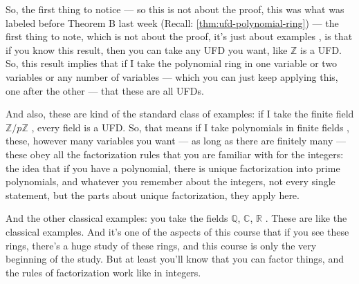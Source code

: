 \begin{speech}[00:00:39 - 00:02:17]
So, the first thing to notice --- so this is not about the proof, this was what was labeled before Theorem B last week  (Recall: \cref{thm:ufd-polynomial-ring}) --- the first thing to note, which is not about the proof, it's just about examples , is that if you know this result, then you can take any UFD you want, like $\mathbb{Z}$ is a UFD. So, this result implies that if I take the polynomial ring in one variable or two variables or any number of variables  --- which you can just keep applying this, one after the other --- that these are all UFDs.

And also, these are kind of the standard class of examples: if I take the finite field $\mathbb{Z} / p\mathbb{Z}$ , every field is a UFD. So, that means if I take polynomials in finite fields , these, however many variables you want --- as long as there are finitely many --- these obey all the factorization rules that you are familiar with for the integers: the idea that if you have a polynomial, there is unique factorization into prime polynomials, and whatever you remember about the integers, not every single statement, but the parts about unique factorization, they apply here.

And the other classical examples: you take the fields $\mathbb{Q}$, $\mathbb{C}$, $\mathbb{R}$ . These are like the classical examples. And it's one of the aspects of this course that if you see these rings, there's a huge study of these rings, and this course is only the very beginning of the study. But at least you'll know that you can factor things, and the rules of factorization work like in integers.
\end{speech}

